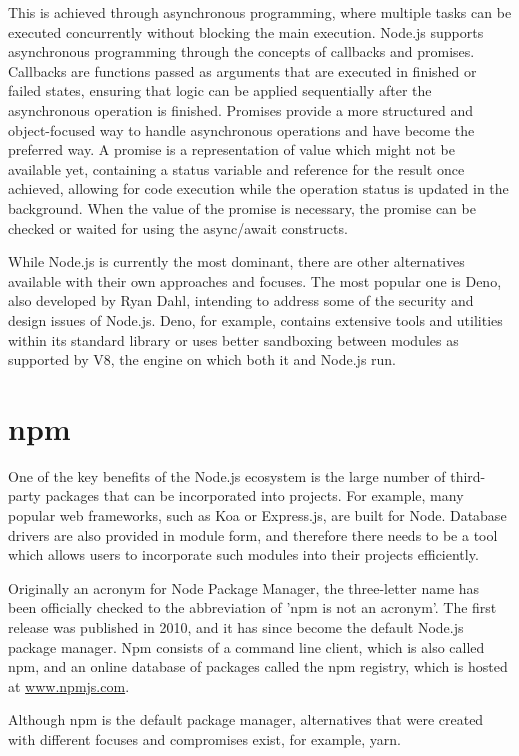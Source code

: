 This is achieved through asynchronous programming, where multiple tasks can be
executed concurrently without blocking the main execution. Node.js supports
asynchronous programming through the concepts of callbacks and promises.
Callbacks are functions passed as arguments that are executed in finished or
failed states, ensuring that logic can be applied sequentially after the
asynchronous operation is finished. Promises provide a more structured and
object-focused way to handle asynchronous operations and have become the
preferred way. A promise is a representation of value which might not be
available yet, containing a status variable and reference for the result once
achieved, allowing for code execution while the operation status is updated in
the background. When the value of the promise is necessary, the promise can be
checked or waited for using the async/await constructs.

While Node.js is currently the most dominant, there are other alternatives
available with their own approaches and focuses. The most popular one is Deno,
also developed by Ryan Dahl, intending to address some of the security and
design issues of Node.js. Deno, for example, contains extensive tools and
utilities within its standard library or uses better sandboxing between modules
as supported by V8, the engine on which both it and Node.js run.


\section{npm}
One of the key benefits of the Node.js ecosystem is the large number of
third-party packages that can be incorporated into projects. For example, many
popular web frameworks, such as Koa or Express.js, are built for Node. Database
drivers are also provided in module form, and therefore there needs to be a tool
which allows users to incorporate such modules into their projects efficiently. 

Originally an acronym for Node Package Manager, the three-letter name has been
officially checked to the abbreviation of 'npm is not an acronym'. The first
release was published in 2010, and it has since become the default Node.js
package manager. Npm consists of a command line client, which is also called
npm, and an online database of packages called the npm registry, which is hosted
at \url{www.npmjs.com}. 

Although npm is the default package manager, alternatives that were created with
different focuses and compromises exist, for example, yarn.


